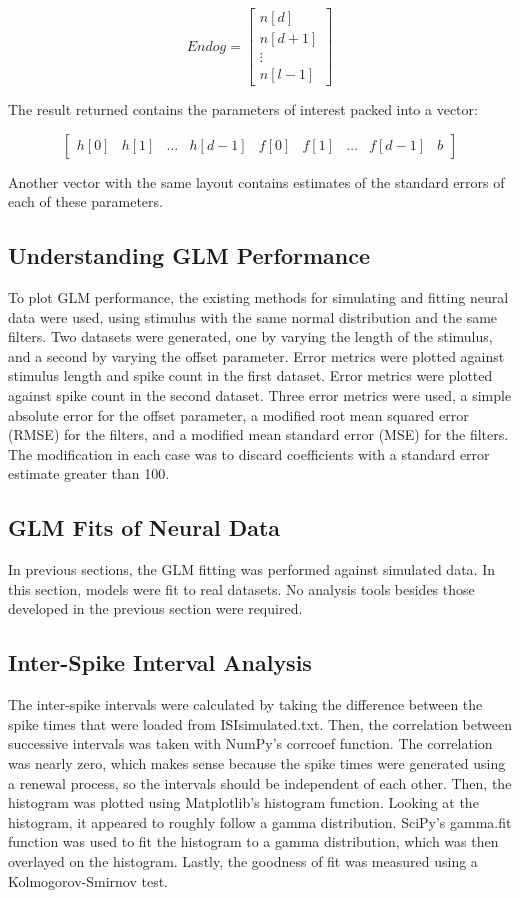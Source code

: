 \documentclass[letterpaper,titlepage,10pt]{article}
\begin{document}
$$Endog=
\begin{bmatrix}
n[d] \\
n[d+1] \\
\vdots \\
n[l-1]
\end{bmatrix}$$

The result returned contains the parameters of interest packed into a vector:

$$\begin{bmatrix}
h[0] & h[1] & \hdots & h[d-1] & f[0] & f[1] & \hdots & f[d-1] & b
\end{bmatrix}$$

Another vector with the same layout contains estimates of the standard errors of each of these parameters.

\subsection{Understanding GLM Performance}

To plot GLM performance, the existing methods for simulating and fitting neural data were used, using stimulus with
the same normal distribution and the same filters. Two datasets were generated, one by varying the length of the
stimulus, and a second by varying the offset parameter. Error metrics were plotted against stimulus length and spike
count in the first dataset. Error metrics were plotted against spike count in the second dataset. Three error metrics
were used, a simple absolute error for the offset parameter, a modified root mean squared error (RMSE) for the filters,
and a modified mean standard error (MSE) for the filters. The modification in each case was to discard coefficients
with a standard error estimate greater than 100.

\subsection{GLM Fits of Neural Data}

In previous sections, the GLM fitting was performed against simulated data. In this section, models were fit to real
datasets. No analysis tools besides those developed in the previous section were required.

\subsection{Inter-Spike Interval Analysis}

The inter-spike intervals were calculated by taking the difference between the spike times that were loaded from
ISIsimulated.txt. Then, the correlation between successive intervals was taken with NumPy's corrcoef function.
The correlation was nearly zero, which makes sense because the spike times were generated using a renewal process,
so the intervals should be independent of each other. Then, the histogram was plotted using Matplotlib's histogram
function. Looking at the histogram, it appeared to roughly follow a gamma distribution. SciPy's gamma.fit function
was used to fit the histogram to a gamma distribution, which was then overlayed on the histogram. Lastly, the
goodness of fit was measured using a Kolmogorov-Smirnov test.
\end{document}
